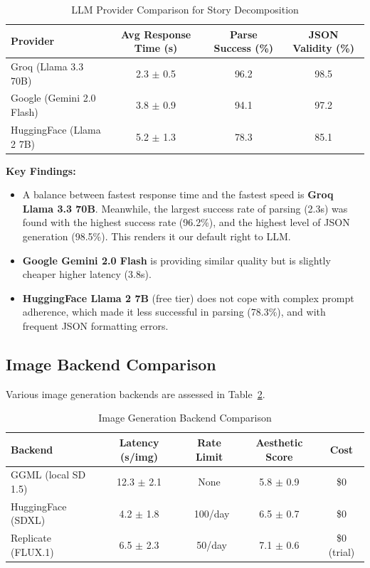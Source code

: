 \documentclass[runningheads]{llncs}
\begin{document}
\begin{table}[t]
\centering
\caption{LLM Provider Comparison for Story Decomposition}
\label{tab:llm_comparison}
\begin{tabular}{lccc}
\toprule
\textbf{Provider} & \textbf{Avg Response Time (s)} & \textbf{Parse Success (\%)} & \textbf{JSON Validity (\%)} \\
\midrule
Groq (Llama 3.3 70B) & 2.3 $\pm$ 0.5 & 96.2 & 98.5 \\
Google (Gemini 2.0 Flash) & 3.8 $\pm$ 0.9 & 94.1 & 97.2 \\
HuggingFace (Llama 2 7B) & 5.2 $\pm$ 1.3 & 78.3 & 85.1 \\
\bottomrule
\end{tabular}
\end{table}

\textbf{Key Findings:}
\begin{itemize}
\item A balance between fastest response time and the fastest speed is \textbf{Groq Llama 3.3 70B}. Meanwhile, the largest success rate of parsing (2.3s) was found with the highest success rate (96.2\%), and the highest level of JSON generation (98.5\%). This renders it our default right to LLM.
\item \textbf{Google Gemini 2.0 Flash} is providing similar quality but is slightly cheaper higher latency (3.8s).
\item \textbf{HuggingFace Llama 2 7B} (free tier) does not cope with complex prompt adherence, which made it less successful in parsing (78.3\%), and with frequent JSON formatting errors.
\end{itemize}

\subsection{Image Backend Comparison}

Various image generation backends are assessed in Table~\ref{tab:backend_comparison}.

\begin{table}[t]
\centering
\caption{Image Generation Backend Comparison}
\label{tab:backend_comparison}
\begin{tabular}{lcccc}
\toprule
\textbf{Backend} & \textbf{Latency (s/img)} & \textbf{Rate Limit} & \textbf{Aesthetic Score} & \textbf{Cost} \\
\midrule
GGML (local SD 1.5) & 12.3 $\pm$ 2.1 & None & 5.8 $\pm$ 0.9 & \$0 \\
HuggingFace (SDXL) & 4.2 $\pm$ 1.8 & ~100/day & 6.5 $\pm$ 0.7 & \$0 \\
Replicate (FLUX.1) & 6.5 $\pm$ 2.3 & ~50/day & 7.1 $\pm$ 0.6 & \$0 (trial) \\
\bottomrule
\end{tabular}
\end{table}
\end{document}
